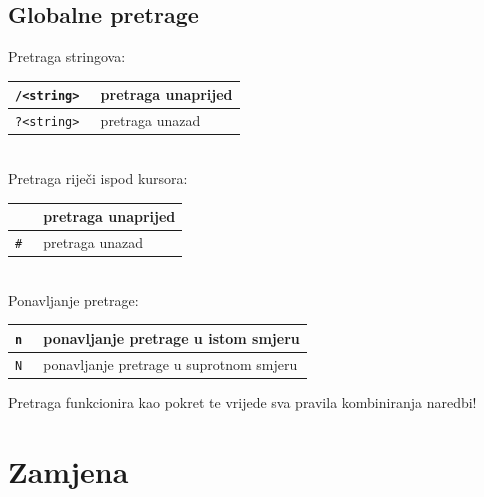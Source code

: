 \documentclass[10pt]{article}
\begin{document}
    \subsection*{\color{ForestGreen} Globalne pretrage}
    Pretraga stringova:
    \\
    \begin{tabular}{|>{\tt}p{9.00cm}|>{}p{15.50cm}|}
        \hline
        /<string>   & pretraga unaprijed            \\ \hline
        ?<string>   & pretraga unazad               \\ \hline
    \end{tabular}
    \\
    Pretraga riječi ispod kursora:
    \\
    \begin{tabular}{|>{\tt}p{9.00cm}|>{}p{15.50cm}|}
        \hline
        *           & pretraga unaprijed        \\ \hline
        \#          & pretraga unazad           \\ \hline
    \end{tabular}
    \\
    Ponavljanje pretrage:
    \\
    \begin{tabular}{|>{\tt}p{9.00cm}|>{}p{15.50cm}|}
        \hline
        n         & ponavljanje pretrage u istom smjeru         \\ \hline
        N         & ponavljanje pretrage u suprotnom smjeru     \\ \hline
    \end{tabular}
    \begin{center}
        \large
        Pretraga funkcionira kao pokret te vrijede sva pravila kombiniranja naredbi!
    \end{center}
    \newpage
    
    \section*{\color{ForestGreen} Zamjena}
\end{document}
